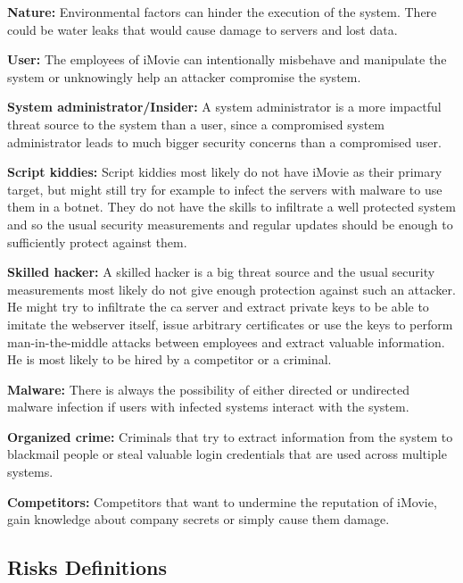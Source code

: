 \documentclass[english]{article}
\begin{document}
\begin{description}
\item{\textbf{Nature:}} Environmental factors can hinder the execution of the system. There could be water leaks that would cause damage to servers and lost data.
\item{\textbf{User:}} The employees of iMovie can intentionally misbehave and manipulate the system or unknowingly help an attacker compromise the system.
\item{\textbf{System administrator/Insider:}} A system administrator is a more impactful threat source to the system than a user, since a compromised system administrator leads to much bigger security concerns than a compromised user.
\item{\textbf{Script kiddies:}} Script kiddies most likely do not have iMovie as their primary target, but might still try for example to infect the servers with malware to use them in a botnet. They do not have the skills to infiltrate a well protected system and so the usual security measurements and regular updates should be enough to sufficiently protect against them.
\item{\textbf{Skilled hacker:}} A skilled hacker is a big threat source and the usual security measurements most likely do not give enough protection against such an attacker. He might try to infiltrate the ca server and extract private keys to be able to imitate the webserver itself, issue arbitrary certificates or use the keys to perform man-in-the-middle attacks between employees and extract valuable information. He is most likely to be hired by a competitor or a criminal.
\item{\textbf{Malware:}} There is always the possibility of either directed or undirected malware infection if users with infected systems interact with the system.
\item{\textbf{Organized crime:}} Criminals that try to extract information from the system to blackmail people or steal valuable login credentials that are used across multiple systems.
\item{\textbf{Competitors:}} Competitors that want to undermine the reputation of iMovie, gain knowledge about company secrets or simply cause them damage.
\end{description}

\subsection{Risks Definitions}
\end{document}
